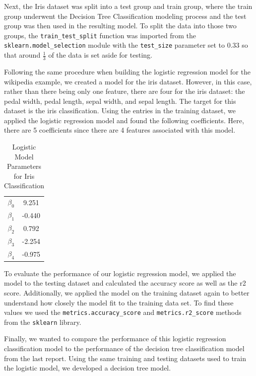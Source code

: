 \documentclass[journal]{IEEEtran}
\begin{document}
Next, the Iris dataset was split into a test group and train group, where the train group underwent the Decision Tree Classification modeling process and the test group was then used in the resulting model. To split the data into those two groups, the \lstinline{train_test_split} function was imported from the \lstinline{sklearn.model_selection} module with the \lstinline{test_size} parameter set to 0.33 so that around \(\frac{1}{3}\) of the data is set aside for testing.

Following the same procedure when building the logistic regression model for the wikipedia example, we created a model for the iris dataset. However, in this case, rather than there being only one feature, there are four for the iris dataset: the pedal width, pedal length, sepal width, and sepal length. The target for this dataset is the iris classification. Using the entries in the training dataset, we applied the logistic regression model and found the following coefficients. Here, there are 5 coefficients since there are 4 features associated with this model. 

\begin{table}[h!]
    \centering
    \begin{tabular}{c c}
        $\beta_0$ &  9.251 \\
        $\beta_1$ &  -0.440 \\
        $\beta_2$ &  0.792 \\
        $\beta_3$ &  -2.254 \\
        $\beta_4$ &  -0.975 
    \end{tabular}    
    \caption{Logistic Model Parameters for Iris Classification}
    \end{table}

To evaluate the performance of our logistic regression model, we applied the model to the testing dataset and calculated the accuracy score as well as the r2 score. Additionally, we applied the model on the training dataset again to better understand how closely the model fit to the training data set. To find these values we used the \lstinline{metrics.accuracy_score} and \lstinline{metrics.r2_score} methods from the \lstinline{sklearn} library. 

Finally, we wanted to compare the performance of this logistic regression classification model to the performance of the decision tree classification model from the last report. Using the same training and testing datasets used to train the logistic model, we developed a decision tree model. 
\end{document}
